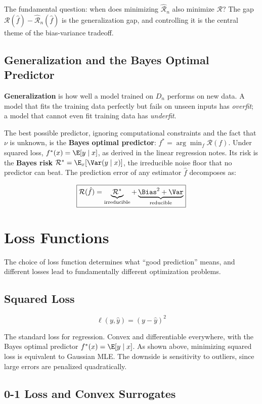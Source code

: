 \documentclass[main.tex]{subfiles}
\begin{document}
The fundamental question: when does minimizing $\hat{\mathcal{R}}_n$ also minimize $\mathcal{R}$? The gap $\mathcal{R}(\hat{f}) - \hat{\mathcal{R}}_n(\hat{f})$ is the generalization gap, and controlling it is the central theme of the bias-variance tradeoff.

\subsection{Generalization and the Bayes Optimal Predictor}

\textbf{Generalization} is how well a model trained on $D_n$ performs on new data. A model that fits the training data perfectly but fails on unseen inputs has \textit{overfit}; a model that cannot even fit training data has \textit{underfit}.

The best possible predictor, ignoring computational constraints and the fact that $\nu$ is unknown, is the \textbf{Bayes optimal predictor}: $f^* = \arg\min_f \mathcal{R}(f)$. Under squared loss, $f^*(x) = \E[y \mid x]$, as derived in the linear regression notes. Its risk is the \textbf{Bayes risk} $\mathcal{R}^* = \E_x[\Var(y \mid x)]$, the irreducible noise floor that no predictor can beat. The prediction error of any estimator $\hat{f}$ decomposes as:

$$\boxed{\mathcal{R}(\hat{f}) = \underbrace{\mathcal{R}^*}_{\text{irreducible}} + \underbrace{\Bias^2 + \Var}_{\text{reducible}}}$$

\needspace{0.33\textheight}
\section{Loss Functions}

The choice of loss function determines what ``good prediction'' means, and different losses lead to fundamentally different optimization problems.

\subsection{Squared Loss}

$$\ell(y, \hat{y}) = (y - \hat{y})^2$$

The standard loss for regression. Convex and differentiable everywhere, with the Bayes optimal predictor $f^*(x) = \E[y \mid x]$. As shown above, minimizing squared loss is equivalent to Gaussian MLE. The downside is sensitivity to outliers, since large errors are penalized quadratically.

\subsection{0-1 Loss and Convex Surrogates}
\end{document}
